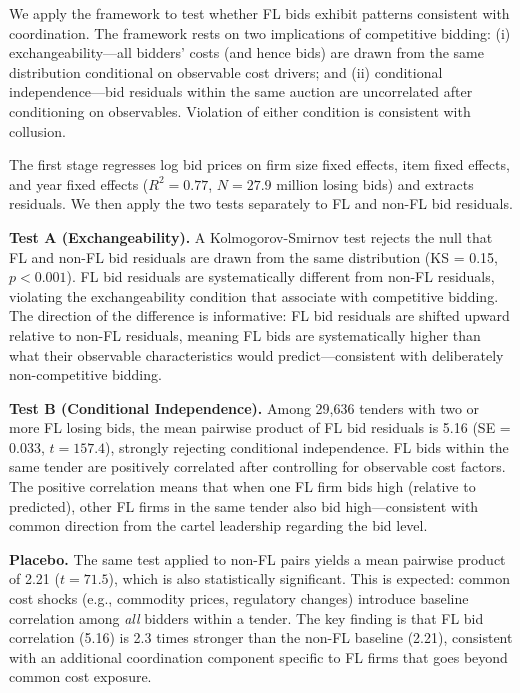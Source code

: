 We apply the \citet{bajari2003deciding} framework to test whether FL bids exhibit patterns consistent with coordination. The framework rests on two implications of competitive bidding: (i) exchangeability---all bidders' costs (and hence bids) are drawn from the same distribution conditional on observable cost drivers; and (ii) conditional independence---bid residuals within the same auction are uncorrelated after conditioning on observables. Violation of either condition is consistent with collusion.

The first stage regresses log bid prices on firm size fixed effects, item fixed effects, and year fixed effects ($R^2 = 0.77$, $N = 27.9$ million losing bids) and extracts residuals. We then apply the two tests separately to FL and non-FL bid residuals.

\textbf{Test A (Exchangeability).} A Kolmogorov-Smirnov test rejects the null that FL and non-FL bid residuals are drawn from the same distribution (KS = 0.15, $p < 0.001$). FL bid residuals are systematically different from non-FL residuals, violating the exchangeability condition that \citet{bajari2003deciding} associate with competitive bidding. The direction of the difference is informative: FL bid residuals are shifted upward relative to non-FL residuals, meaning FL bids are systematically higher than what their observable characteristics would predict---consistent with deliberately non-competitive bidding.

\textbf{Test B (Conditional Independence).} Among 29,636 tenders with two or more FL losing bids, the mean pairwise product of FL bid residuals is 5.16 (SE = 0.033, $t = 157.4$), strongly rejecting conditional independence. FL bids within the same tender are positively correlated after controlling for observable cost factors. The positive correlation means that when one FL firm bids high (relative to predicted), other FL firms in the same tender also bid high---consistent with common direction from the cartel leadership regarding the bid level.

\textbf{Placebo.} The same test applied to non-FL pairs yields a mean pairwise product of 2.21 ($t = 71.5$), which is also statistically significant. This is expected: common cost shocks (e.g., commodity prices, regulatory changes) introduce baseline correlation among \textit{all} bidders within a tender. The key finding is that FL bid correlation (5.16) is 2.3 times stronger than the non-FL baseline (2.21), consistent with an additional coordination component specific to FL firms that goes beyond common cost exposure.

